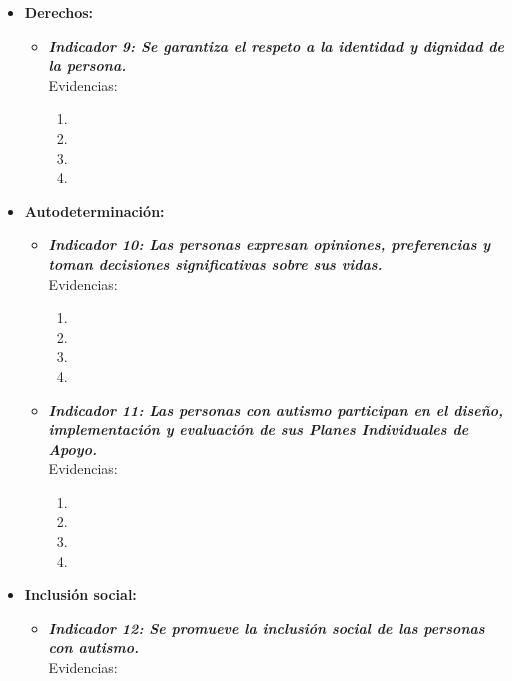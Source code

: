 \begin{itemize}
\begin{itemize}
\begin{itemize}
\begin{itemize}
				\begin{enumerate}
					\item 
					\item 
					\item 
					\item 
				\end{enumerate}
			\end{itemize}
			\item \textbf{Derechos:}
			\begin{itemize}
				\item \textbf{\textit{Indicador 9: Se garantiza el respeto a la identidad y dignidad de la persona.}}\\Evidencias:
				
				\begin{enumerate}
					\item 
					\item 
					\item 
					\item 
				\end{enumerate}
			\end{itemize}
			\item \textbf{Autodeterminación:}
			\begin{itemize}
				\item \textbf{\textit{Indicador 10: Las personas expresan opiniones, preferencias y toman decisiones significativas sobre sus vidas.}}\\Evidencias:
				
				\begin{enumerate}
					\item 
					\item 
					\item 
					\item 
				\end{enumerate}
				\item \textbf{\textit{Indicador 11: Las personas con autismo participan en el diseño, implementación y evaluación de sus Planes Individuales de Apoyo.}}\\Evidencias:
				
				\begin{enumerate}
					\item 
					\item 
					\item 
					\item 
				\end{enumerate}
			\end{itemize}
			\item \textbf{Inclusión social:}
			\begin{itemize}
				\item \textbf{\textit{Indicador 12: Se promueve la inclusión social de las personas con autismo.}}\\Evidencias:
				

\end{itemize}
\end{itemize}
\end{itemize}
\end{itemize}
